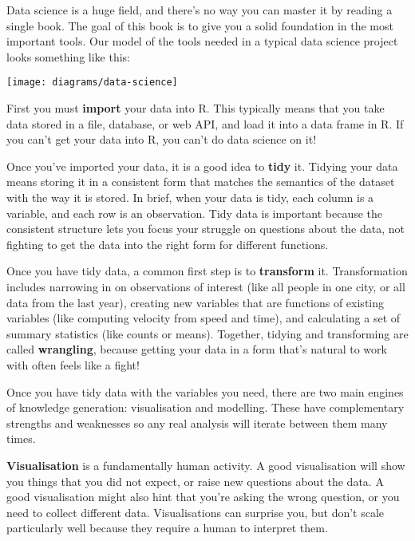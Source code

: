 \documentclass[]{book}
\begin{document}
Data science is a huge field, and there's no way you can master it by
reading a single book. The goal of this book is to give you a solid
foundation in the most important tools. Our model of the tools needed in
a typical data science project looks something like this:

\begin{center}\texttt{[image: diagrams/data-science]} \end{center}

First you must \textbf{import} your data into R. This typically means
that you take data stored in a file, database, or web API, and load it
into a data frame in R. If you can't get your data into R, you can't do
data science on it!

Once you've imported your data, it is a good idea to \textbf{tidy} it.
Tidying your data means storing it in a consistent form that matches the
semantics of the dataset with the way it is stored. In brief, when your
data is tidy, each column is a variable, and each row is an observation.
Tidy data is important because the consistent structure lets you focus
your struggle on questions about the data, not fighting to get the data
into the right form for different functions.

Once you have tidy data, a common first step is to \textbf{transform}
it. Transformation includes narrowing in on observations of interest
(like all people in one city, or all data from the last year), creating
new variables that are functions of existing variables (like computing
velocity from speed and time), and calculating a set of summary
statistics (like counts or means). Together, tidying and transforming
are called \textbf{wrangling}, because getting your data in a form
that's natural to work with often feels like a fight!

Once you have tidy data with the variables you need, there are two main
engines of knowledge generation: visualisation and modelling. These have
complementary strengths and weaknesses so any real analysis will iterate
between them many times.

\textbf{Visualisation} is a fundamentally human activity. A good
visualisation will show you things that you did not expect, or raise new
questions about the data. A good visualisation might also hint that
you're asking the wrong question, or you need to collect different data.
Visualisations can surprise you, but don't scale particularly well
because they require a human to interpret them.
\end{document}
